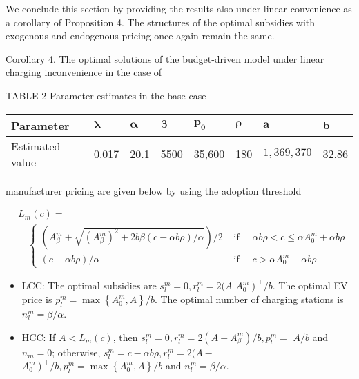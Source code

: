 \documentclass[10pt]{article}
\begin{document}
We conclude this section by providing the results also under linear convenience as a corollary of Proposition 4. The structures of the optimal subsidies with exogenous and endogenous pricing once again remain the same.

Corollary 4. The optimal solutions of the budget-driven model under linear charging inconvenience in the case of

TABLE 2 Parameter estimates in the base case

\begin{center}
\begin{tabular}{llllllll}
\hline
Parameter & $\boldsymbol{\lambda}$ & $\boldsymbol{\alpha}$ & $\boldsymbol{\beta}$ & $\boldsymbol{p}_{\boldsymbol{0}}$ & $\boldsymbol{\rho}$ & $\boldsymbol{a}$ & $\boldsymbol{b}$ \\
\hline
Estimated value & 0.017 & 20.1 & 5500 & 35,600 & 180 & $1,369,370$ & 32.86 \\
\hline
\end{tabular}
\end{center}

manufacturer pricing are given below by using the adoption threshold


\begin{align*}
& L_{m}(c)= \\
& \quad \begin{cases}\left(A_{\beta}^{m}+\sqrt{\left(A_{\beta}^{m}\right)^{2}+2 b \beta(c-\alpha b \rho) / \alpha}\right) / 2 & \text { if } \quad \alpha b \rho<c \leq \alpha A_{0}^{m}+\alpha b \rho \\
(c-\alpha b \rho) / \alpha & \text { if } \quad c>\alpha A_{0}^{m}+\alpha b \rho\end{cases} \tag{21}
\end{align*}


\begin{itemize}
  \item LCC: The optimal subsidies are $s_{l}^{m}=0, r_{l}^{m}=2(A$ $\left.A_{0}^{m}\right)^{+} / b$. The optimal EV price is $p_{l}^{m}=\max \left\{A_{0}^{m}, A\right\} / b$. The optimal number of charging stations is $n_{l}^{m}=\beta / \alpha$.
  \item HCC: If $A<L_{m}(c)$, then $s_{l}^{m}=0, r_{l}^{m}=2\left(A-A_{\beta}^{m}\right) / b, p_{l}^{m}=$ $A / b$ and $n_{m}=0$; otherwise, $s_{l}^{m}=c-\alpha b \rho, r_{l}^{m}=2(A-$ $\left.A_{0}^{m}\right)^{+} / b, p_{l}^{m}=\max \left\{A_{0}^{m}, A\right\} / b$ and $n_{l}^{m}=\beta / \alpha$.
\end{itemize}
\end{document}
